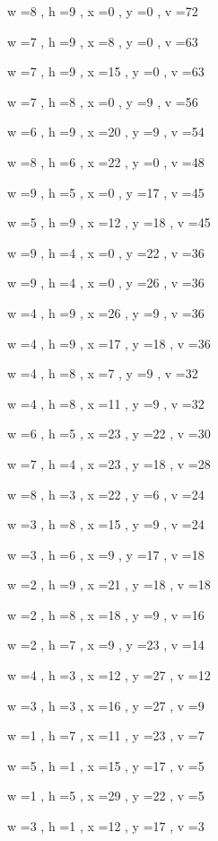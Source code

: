 \documentclass[11pt]{article}
\begin{document}
w =8 , h =9 , x =0 , y =0 , v =72
\par
w =7 , h =9 , x =8 , y =0 , v =63
\par
w =7 , h =9 , x =15 , y =0 , v =63
\par
w =7 , h =8 , x =0 , y =9 , v =56
\par
w =6 , h =9 , x =20 , y =9 , v =54
\par
w =8 , h =6 , x =22 , y =0 , v =48
\par
w =9 , h =5 , x =0 , y =17 , v =45
\par
w =5 , h =9 , x =12 , y =18 , v =45
\par
w =9 , h =4 , x =0 , y =22 , v =36
\par
w =9 , h =4 , x =0 , y =26 , v =36
\par
w =4 , h =9 , x =26 , y =9 , v =36
\par
w =4 , h =9 , x =17 , y =18 , v =36
\par
w =4 , h =8 , x =7 , y =9 , v =32
\par
w =4 , h =8 , x =11 , y =9 , v =32
\par
w =6 , h =5 , x =23 , y =22 , v =30
\par
w =7 , h =4 , x =23 , y =18 , v =28
\par
w =8 , h =3 , x =22 , y =6 , v =24
\par
w =3 , h =8 , x =15 , y =9 , v =24
\par
w =3 , h =6 , x =9 , y =17 , v =18
\par
w =2 , h =9 , x =21 , y =18 , v =18
\par
w =2 , h =8 , x =18 , y =9 , v =16
\par
w =2 , h =7 , x =9 , y =23 , v =14
\par
w =4 , h =3 , x =12 , y =27 , v =12
\par
w =3 , h =3 , x =16 , y =27 , v =9
\par
w =1 , h =7 , x =11 , y =23 , v =7
\par
w =5 , h =1 , x =15 , y =17 , v =5
\par
w =1 , h =5 , x =29 , y =22 , v =5
\par
w =3 , h =1 , x =12 , y =17 , v =3
\par
\newpage
\end{document}
